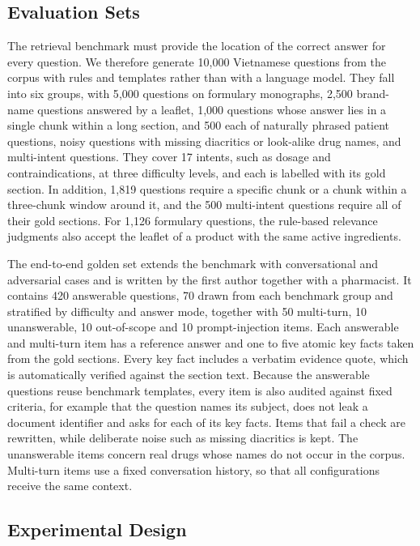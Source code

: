 \subsection{Evaluation Sets}\label{sec:eval-sets}

The retrieval benchmark must provide the location of the correct answer for every question. We therefore generate 10{,}000 Vietnamese questions from the corpus with rules and templates rather than with a language model. They fall into six groups, with 5{,}000 questions on formulary monographs, 2{,}500 brand-name questions answered by a leaflet, 1{,}000 questions whose answer lies in a single chunk within a long section, and 500 each of naturally phrased patient questions, noisy questions with missing diacritics or look-alike drug names, and multi-intent questions. They cover 17 intents, such as dosage and contraindications, at three difficulty levels, and each is labelled with its gold section. In addition, 1{,}819 questions require a specific chunk or a chunk within a three-chunk window around it, and the 500 multi-intent questions require all of their gold sections. For 1{,}126 formulary questions, the rule-based relevance judgments also accept the leaflet of a product with the same active ingredients.

The end-to-end golden set extends the benchmark with conversational and adversarial cases and is written by the first author together with a pharmacist. It contains 420 answerable questions, 70 drawn from each benchmark group and stratified by difficulty and answer mode, together with 50 multi-turn, 10 unanswerable, 10 out-of-scope and 10 prompt-injection items. Each answerable and multi-turn item has a reference answer and one to five atomic key facts taken from the gold sections. Every key fact includes a verbatim evidence quote, which is automatically verified against the section text. Because the answerable questions reuse benchmark templates, every item is also audited against fixed criteria, for example that the question names its subject, does not leak a document identifier and asks for each of its key facts. Items that fail a check are rewritten, while deliberate noise such as missing diacritics is kept. The unanswerable items concern real drugs whose names do not occur in the corpus. Multi-turn items use a fixed conversation history, so that all configurations receive the same context.

\subsection{Experimental Design}\label{sec:design}

